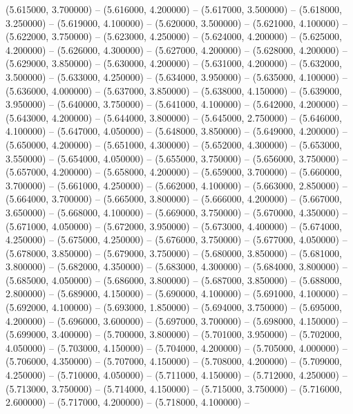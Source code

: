 (5.615000, 3.700000) -- 
(5.616000, 4.200000) -- 
(5.617000, 3.500000) -- 
(5.618000, 3.250000) -- 
(5.619000, 4.100000) -- 
(5.620000, 3.500000) -- 
(5.621000, 4.100000) -- 
(5.622000, 3.750000) -- 
(5.623000, 4.250000) -- 
(5.624000, 4.200000) -- 
(5.625000, 4.200000) -- 
(5.626000, 4.300000) -- 
(5.627000, 4.200000) -- 
(5.628000, 4.200000) -- 
(5.629000, 3.850000) -- 
(5.630000, 4.200000) -- 
(5.631000, 4.200000) -- 
(5.632000, 3.500000) -- 
(5.633000, 4.250000) -- 
(5.634000, 3.950000) -- 
(5.635000, 4.100000) -- 
(5.636000, 4.000000) -- 
(5.637000, 3.850000) -- 
(5.638000, 4.150000) -- 
(5.639000, 3.950000) -- 
(5.640000, 3.750000) -- 
(5.641000, 4.100000) -- 
(5.642000, 4.200000) -- 
(5.643000, 4.200000) -- 
(5.644000, 3.800000) -- 
(5.645000, 2.750000) -- 
(5.646000, 4.100000) -- 
(5.647000, 4.050000) -- 
(5.648000, 3.850000) -- 
(5.649000, 4.200000) -- 
(5.650000, 4.200000) -- 
(5.651000, 4.300000) -- 
(5.652000, 4.300000) -- 
(5.653000, 3.550000) -- 
(5.654000, 4.050000) -- 
(5.655000, 3.750000) -- 
(5.656000, 3.750000) -- 
(5.657000, 4.200000) -- 
(5.658000, 4.200000) -- 
(5.659000, 3.700000) -- 
(5.660000, 3.700000) -- 
(5.661000, 4.250000) -- 
(5.662000, 4.100000) -- 
(5.663000, 2.850000) -- 
(5.664000, 3.700000) -- 
(5.665000, 3.800000) -- 
(5.666000, 4.200000) -- 
(5.667000, 3.650000) -- 
(5.668000, 4.100000) -- 
(5.669000, 3.750000) -- 
(5.670000, 4.350000) -- 
(5.671000, 4.050000) -- 
(5.672000, 3.950000) -- 
(5.673000, 4.400000) -- 
(5.674000, 4.250000) -- 
(5.675000, 4.250000) -- 
(5.676000, 3.750000) -- 
(5.677000, 4.050000) -- 
(5.678000, 3.850000) -- 
(5.679000, 3.750000) -- 
(5.680000, 3.850000) -- 
(5.681000, 3.800000) -- 
(5.682000, 4.350000) -- 
(5.683000, 4.300000) -- 
(5.684000, 3.800000) -- 
(5.685000, 4.050000) -- 
(5.686000, 3.800000) -- 
(5.687000, 3.850000) -- 
(5.688000, 2.800000) -- 
(5.689000, 4.150000) -- 
(5.690000, 4.100000) -- 
(5.691000, 4.100000) -- 
(5.692000, 4.100000) -- 
(5.693000, 1.850000) -- 
(5.694000, 3.750000) -- 
(5.695000, 4.200000) -- 
(5.696000, 3.600000) -- 
(5.697000, 3.700000) -- 
(5.698000, 4.150000) -- 
(5.699000, 3.400000) -- 
(5.700000, 3.800000) -- 
(5.701000, 3.950000) -- 
(5.702000, 4.050000) -- 
(5.703000, 4.150000) -- 
(5.704000, 4.200000) -- 
(5.705000, 4.000000) -- 
(5.706000, 4.350000) -- 
(5.707000, 4.150000) -- 
(5.708000, 4.200000) -- 
(5.709000, 4.250000) -- 
(5.710000, 4.050000) -- 
(5.711000, 4.150000) -- 
(5.712000, 4.250000) -- 
(5.713000, 3.750000) -- 
(5.714000, 4.150000) -- 
(5.715000, 3.750000) -- 
(5.716000, 2.600000) -- 
(5.717000, 4.200000) -- 
(5.718000, 4.100000) -- 
